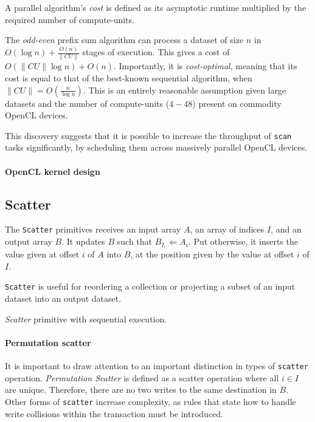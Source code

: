 A parallel algorithm's \emph{cost} is defined as its asymptotic runtime multiplied by the required number of compute-units.


The \emph{odd-even} prefix sum algorithm can process a dataset of size $n$ in $O(\log n) + \frac{O(n)}{\|CU\|}$ stages of execution. This gives a cost of $O(\|CU\| \log n) + O(n)$.
Importantly, it is \emph{cost-optimal}, meaning that its cost is equal to that of the best-known sequential algorithm, when $\|CU\| = O(\frac{n}{\log n})$. This is an entirely reasonable assumption given large datasets and the number of compute-units ($4-48$) present on commodity \ac{OpenCL} devices.

This discovery suggests that it is possible to increase the throughput of \verb|scan| tasks significantly, by scheduling them across massively parallel \ac{OpenCL} devices.

\paragraph*{\ac{OpenCL} kernel design}

\subsection{Scatter}
The \verb|Scatter| primitives receives an input array $A$, an array of indices $I$, and an output array $B$. It updates $B$ such that $B_{I_i} \Leftarrow A_i$. Put otherwise, it inserts the value given at offset $i$ of $A$ into $B$, at the position given by the value at offset $i$ of $I$.

\verb|Scatter| is useful for reordering a collection or projecting a subset of an input dataset into an output dataset.

\begin{algorithm}
  \caption{\emph{Scatter} primitive with sequential execution.}
  \label{alg:seqscatter}

  \begin{algorithmic}
      \EndFor
    \EndFunction
  \end{algorithmic}
\end{algorithm}

\paragraph*{Permutation scatter}
It is important to draw attention to an important distinction in types of \verb|scatter| operation. \emph{Permutation Scatter} is defined as a scatter operation where all $i \in I$ are unique. Therefore, there are no two writes to the same destination in $B$. Other forms of \verb|scatter| increase complexity, as rules that state how to handle write collisions within the transaction must be introduced.

